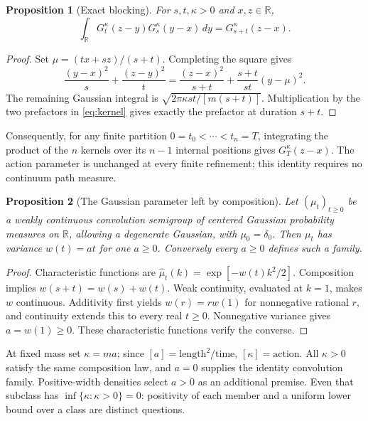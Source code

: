 \documentclass[11pt,a4paper]{article}
\newtheorem{proposition}{Proposition}
\begin{document}
\begin{proposition}[Exact blocking]\label{prop:block}
For $s,t,\kappa>0$ and $x,z\in\mathbb R$,
\[
 \int_{\mathbb R}G_t^\kappa(z-y)G_s^\kappa(y-x)\,dy
 =G_{s+t}^\kappa(z-x).
\]
\end{proposition}
\begin{proof}
Set $\mu=(tx+sz)/(s+t)$. Completing the square gives
\[
 \frac{(y-x)^2}{s}+\frac{(z-y)^2}{t}
 =\frac{(z-x)^2}{s+t}+\frac{s+t}{st}(y-\mu)^2.
\]
The remaining Gaussian integral is
$\sqrt{2\pi\kappa st/[m(s+t)]}$. Multiplication by the two prefactors in
\eqref{eq:kernel} gives exactly the prefactor at duration $s+t$.
\end{proof}

Consequently, for any finite partition $0=t_0<\cdots<t_n=T$,
integrating the product of the $n$ kernels over its $n-1$ internal positions
gives $G_T^\kappa(z-x)$. The action parameter is unchanged at every finite
refinement; this identity requires no continuum path measure.

\begin{proposition}[The Gaussian parameter left by composition]\label{prop:classify}
Let $(\mu_t)_{t\ge0}$ be a weakly continuous convolution semigroup of centered
Gaussian probability measures on $\mathbb R$, allowing a degenerate Gaussian,
with $\mu_0=\delta_0$. Then $\mu_t$ has variance $w(t)=at$ for one $a\ge0$.
Conversely every $a\ge0$ defines such a family.
\end{proposition}
\begin{proof}
Characteristic functions are $\widehat\mu_t(k)=\exp[-w(t)k^2/2]$.
Composition implies $w(s+t)=w(s)+w(t)$. Weak continuity, evaluated at $k=1$,
makes $w$ continuous. Additivity first yields $w(r)=r w(1)$ for nonnegative
rational $r$, and continuity extends this to every real $t\ge0$.
Nonnegative variance gives $a=w(1)\ge0$. These characteristic functions
verify the converse.
\end{proof}

At fixed mass set $\kappa=ma$; since $[a]=\text{length}^2/\text{time}$,
$[\kappa]=\text{action}$. All $\kappa>0$ satisfy the same composition law,
and $a=0$ supplies the identity convolution family. Positive-width densities
select $a>0$ as an additional premise. Even that subclass has
$\inf\{\kappa:\kappa>0\}=0$: positivity of each member and a uniform lower
bound over a class are distinct questions.
\end{document}
